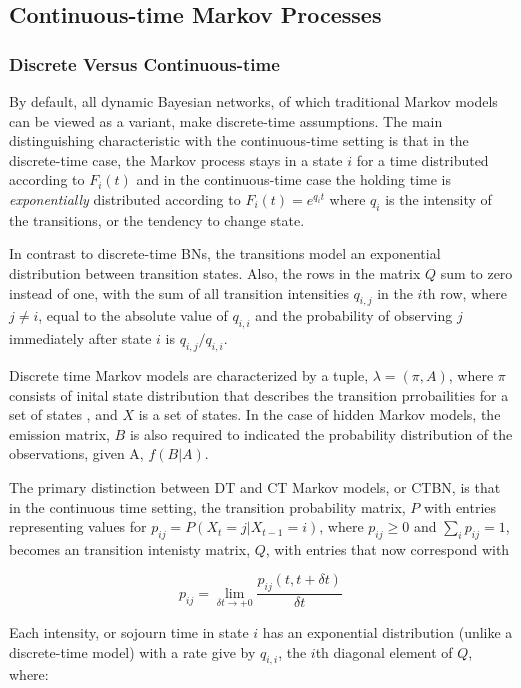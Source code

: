 \subsection{Continuous-time Markov Processes}

\subsubsection{Discrete Versus Continuous-time}
By default, all dynamic Bayesian networks, of which traditional Markov models can be viewed as a variant, make discrete-time assumptions. The main distinguishing characteristic with the continuous-time setting is that in the discrete-time case, the Markov process stays in a state $i$ for a time distributed according to $F_{i}(t)$ and in the continuous-time case the holding time is \emph{exponentially} distributed according to $F_{i}(t) = e^{q_{i}t}$ where $q_{i}$ is the intensity of the transitions, or the tendency to change state. 

In contrast to discrete-time BNs, the transitions model an exponential distribution between transition states.  Also, the rows in the matrix $Q$ sum to zero instead of one, with the sum of all transition intensities $q_{i,j}$ in the $i$th row, where $j\neq i$, equal to the absolute value of  $q_{i,i}$ and the probability of observing $j$ immediately after state $i$ is $q_{i,j}/q_{i,i}$.

Discrete time Markov models are characterized by a tuple, $\lambda = (\pi,A)$, where $\pi$ consists of inital state distribution that describes the transition prrobailities for a set of states , and $X$ is a set of states.  In the case of hidden Markov models, the emission matrix, $B$ is also required to indicated the probability distribution of the observations, given A, $f(B|A)$.

The primary distinction between DT and CT Markov models, or CTBN, is that in the continuous time setting, the transition probability matrix, $P$ with entries representing values for $p_{ij}=P(X_t=j|X_{t-1}=i)$, where $p_{ij}\geq 0$ and $\sum_{i}p_{ij}=1$, becomes an transition intenisty matrix, $Q$, with entries that now correspond with

$$p_{ij}= \lim_{\delta t \to +0} \frac{p_{ij}(t,t+\delta t )}{\delta t}$$

Each intensity, or sojourn time in state $i$ has an exponential distribution (unlike a discrete-time model) with a rate give by $q_{i,i}$, the $i$th diagonal element of $Q$, where:

